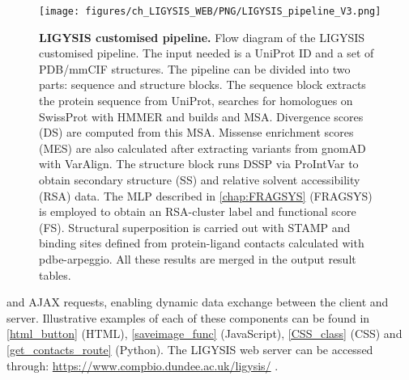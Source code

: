 \begin{figure}[htbp!]
    \centering
    \texttt{[image: figures/ch\_LIGYSIS\_WEB/PNG/LIGYSIS\_pipeline\_V3.png]}
    \caption[LIGYSIS customised pipeline]{\textbf{LIGYSIS customised pipeline.} Flow diagram of the LIGYSIS customised pipeline. The input needed is a UniProt ID and a set of PDB/mmCIF structures. The pipeline can be divided into two parts: sequence and structure blocks. The sequence block extracts the protein sequence from UniProt, searches for homologues on SwissProt with HMMER and builds and MSA. Divergence scores (DS) are computed from this MSA. Missense enrichment scores (MES) are also calculated after extracting variants from gnomAD with VarAlign. The structure block runs DSSP via ProIntVar to obtain secondary structure (SS) and relative solvent accessibility (RSA) data. The MLP described in \autoref{chap:FRAGSYS} (FRAGSYS) is employed to obtain an RSA-cluster label and functional score (FS). Structural superposition is carried out with STAMP and binding sites defined from protein-ligand contacts calculated with pdbe-arpeggio. All these results are merged in the output result tables.}
    \label{fig:ligysis_pipeline}
\end{figure}

\noindent
and AJAX \cite{AJAX} requests, enabling dynamic data exchange between the client and server. Illustrative examples of each of these components can be found in \autoref{html_button} (HTML), \autoref{saveimage_func} (JavaScript), \autoref{CSS_class} (CSS) and \autoref{get_contacts_route} (Python). The LIGYSIS web server can be accessed through: \url{https://www.compbio.dundee.ac.uk/ligysis/} \cite{LIGYSIS_SERVER}.


\lstset{style=mystyle}

